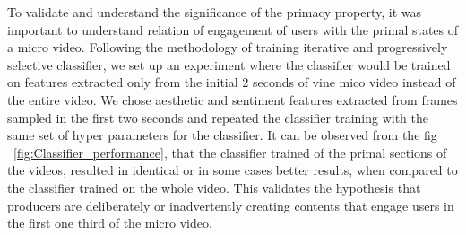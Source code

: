 To validate and understand the significance of the primacy property, it was important to understand relation of engagement of users with the primal states of a micro video. Following the methodology of training iterative and progressively selective classifier, we set up an experiment where the classifier would be trained on features extracted only from the initial 2 seconds of vine mico video instead of the entire video. We chose aesthetic and sentiment features extracted from frames sampled in the first two seconds and repeated the classifier training with the same set of hyper parameters for the classifier. It can be observed from the fig ~\ref{fig:Classifier_performance}, that the classifier trained of the primal sections of the videos, resulted in identical or in some cases better results, when compared to the classifier trained on the whole video. This validates the hypothesis that producers are deliberately or inadvertently creating contents that engage users in the first one third of the micro video. 
